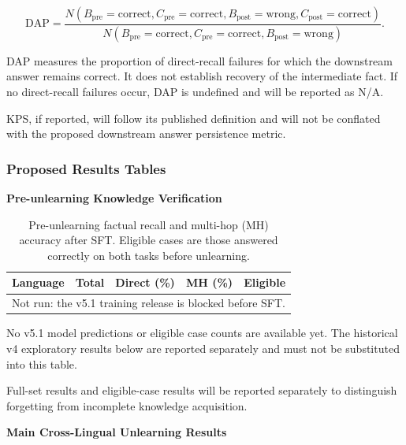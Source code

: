 \documentclass[10pt,a4paper]{article}
\begin{document}
\[
\mathrm{DAP} =
\frac{
N(B_{\mathrm{pre}}=\mathrm{correct},
  C_{\mathrm{pre}}=\mathrm{correct},
  B_{\mathrm{post}}=\mathrm{wrong},
  C_{\mathrm{post}}=\mathrm{correct})
}{
N(B_{\mathrm{pre}}=\mathrm{correct},
  C_{\mathrm{pre}}=\mathrm{correct},
  B_{\mathrm{post}}=\mathrm{wrong})
}.
\]

DAP measures the proportion of direct-recall failures
for which the downstream answer remains correct.
It does not establish recovery of the intermediate
fact. If no direct-recall failures occur, DAP is
undefined and will be reported as N/A.

KPS, if reported, will follow its published definition
\cite{hwang2026knowledge} and will not be conflated
with the proposed downstream answer persistence metric.

\subsubsection*{Proposed Results Tables}

\textbf{Pre-unlearning Knowledge Verification}

\begin{table}[htbp]
\centering
\small
\setlength{\tabcolsep}{4pt}

\begin{tabularx}{\linewidth}{@{}Xrrrr@{}}
\toprule
\textbf{Language} &
\textbf{Total} &
\textbf{Direct (\%)} &
\textbf{MH (\%)} &
\textbf{Eligible} \\
\midrule
\multicolumn{5}{c}{Not run: the v5.1 training release is blocked before SFT.} \\
\bottomrule
\end{tabularx}

\caption{
Pre-unlearning factual recall and multi-hop
(MH) accuracy after SFT. Eligible cases
are those answered correctly on both tasks
before unlearning.
}
\label{tab:baseline}
\end{table}

No v5.1 model predictions or eligible case counts
are available yet. The historical v4 exploratory
results below are reported separately and must not
be substituted into this table.

Full-set results and eligible-case results will be
reported separately to distinguish forgetting from
incomplete knowledge acquisition.


\textbf{Main Cross-Lingual Unlearning Results}
\end{document}
